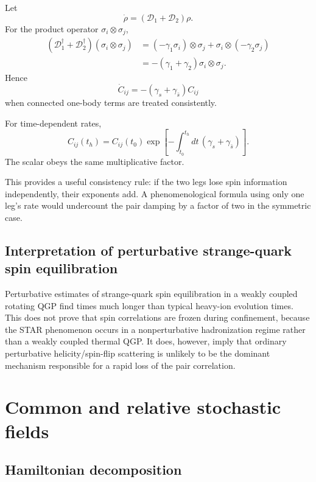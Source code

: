 \documentclass[11pt]{article}
\newcommand{\Dcal}{\mathcal D}
\begin{document}
Let
\begin{equation}
\dot\rho=(\Dcal_1+\Dcal_2)\rho.
\end{equation}
For the product operator $\sigma_i\otimes\sigma_j$,
\begin{align}
(\Dcal_1^\dagger+\Dcal_2^\dagger)(\sigma_i\otimes\sigma_j)
&=(-\gamma_1\sigma_i)\otimes\sigma_j
+\sigma_i\otimes(-\gamma_2\sigma_j)\\
&=-(\gamma_1+\gamma_2)\sigma_i\otimes\sigma_j.
\end{align}
Hence
\begin{equation}
\boxed{
\dot C_{ij}=-(\gamma_s+\gamma_{\bar s})C_{ij}
}
\label{eq:indepC}
\end{equation}
when connected one-body terms are treated consistently.

For time-dependent rates,
\begin{equation}
\boxed{
C_{ij}(t_h)
=C_{ij}(t_0)
\exp\left[-\int_{t_0}^{t_h}dt\,(\gamma_s+\gamma_{\bar s})\right].
}
\label{eq:indepSolution}
\end{equation}
The scalar obeys the same multiplicative factor.

This provides a useful consistency rule: if the two legs lose spin information independently, their exponents add. A phenomenological formula using only one leg's rate would undercount the pair damping by a factor of two in the symmetric case.

\subsection{Interpretation of perturbative strange-quark spin equilibration}

Perturbative estimates of strange-quark spin equilibration in a weakly coupled rotating QGP find times much longer than typical heavy-ion evolution times. This does not prove that spin correlations are frozen during confinement, because the STAR phenomenon occurs in a nonperturbative hadronization regime rather than a weakly coupled thermal QGP. It does, however, imply that ordinary perturbative helicity/spin-flip scattering is unlikely to be the dominant mechanism responsible for a rapid loss of the pair correlation.

\section{Common and relative stochastic fields}

\subsection{Hamiltonian decomposition}
\end{document}
